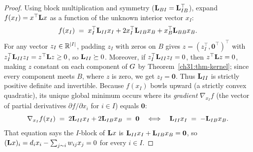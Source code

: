 \begin{proof}
Using block multiplication and symmetry ($\mathbf{L}_{BI}=\mathbf{L}_{IB}^\top$), expand $f(x_I) = x^\top\mathbf{L} x$ as a function of the unknown interior vector $x_I$:
\[
  f(x_I) \;=\; x_I^\top\mathbf{L}_{II}x_I + 2 x_I^\top\mathbf{L}_{IB}x_B + x_B^\top\mathbf{L}_{BB}x_B .
\]
For any vector $z_I \in \mathbb{R}^{\lvert I\rvert}$, padding $z_I$ with zeros on $B$ gives $z = (z_I^\top, \mathbf{0}^\top)^\top$ with $z_I^\top \mathbf{L}_{II} z_I = z^\top \mathbf{L} z \ge 0$, so $\mathbf{L}_{II} \succeq 0$. Moreover, if $z_I^\top \mathbf{L}_{II} z_I = 0$, then $z^\top \mathbf{L} z = 0$, making $z$ constant on each component of $G$ by Theorem~\ref{ch31:thm-kernel}; since every component meets $B$, where $z$ is zero, we get $z_I = \mathbf{0}$. Thus $\mathbf{L}_{II}$ is strictly positive definite and invertible. Because $f(x_I)$ bowls upward (a strictly convex quadratic), its unique global minimum occurs where its \emph{gradient} $\nabla_{x_I} f$ (the vector of partial derivatives $\partial f / \partial x_i$ for $i\in I$) equals $\mathbf{0}$:
\[
  \nabla_{x_I} f(x_I) \;=\; 2\mathbf{L}_{II}x_I + 2\mathbf{L}_{IB}x_B \;=\; \mathbf{0}
  \quad\Longleftrightarrow\quad
  \mathbf{L}_{II}x_I \;=\; -\mathbf{L}_{IB}x_B .
\]
That equation says the $I$-block of $\mathbf{L} x$ is $\mathbf{L}_{II}x_I + \mathbf{L}_{IB}x_B = \mathbf{0}$, so $(\mathbf{L} x)_i = d_i x_i - \sum_{j\sim i}w_{ij}x_j = 0$ for every $i\in I$.
\end{proof}

